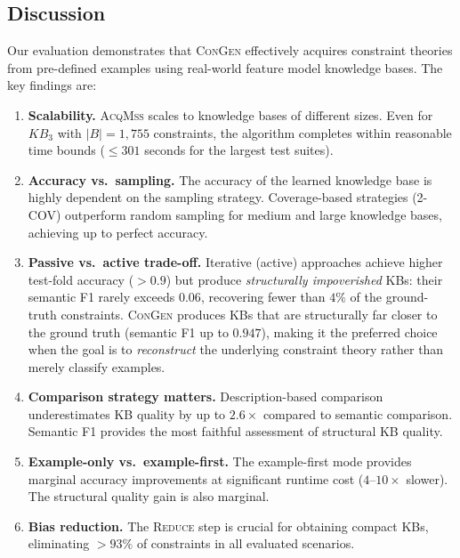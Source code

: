 
\subsection{Discussion}

Our evaluation demonstrates that \textsc{ConGen} effectively acquires constraint theories from pre-defined examples using real-world feature model knowledge bases. The key findings are:

\begin{enumerate}
    \item \textbf{Scalability.} \textsc{AcqMss} scales to knowledge bases of different sizes. Even for $KB_3$ with $|B|{=}1{,}755$ constraints, the algorithm completes within reasonable time bounds (${\leq}301$ seconds for the largest test suites).

    \item \textbf{Accuracy vs.\ sampling.} The accuracy of the learned knowledge base is highly dependent on the sampling strategy. Coverage-based strategies (2-COV) outperform random sampling for medium and large knowledge bases, achieving up to perfect accuracy.

    \item \textbf{Passive vs.\ active trade-off.} Iterative (active) approaches achieve higher test-fold accuracy ($>0.9$) but produce \textit{structurally impoverished} KBs: their semantic F1 rarely exceeds $0.06$, recovering fewer than $4\%$ of the ground-truth constraints. \textsc{ConGen} produces KBs that are structurally far closer to the ground truth (semantic F1 up to $0.947$), making it the preferred choice when the goal is to \textit{reconstruct} the underlying constraint theory rather than merely classify examples.

    \item \textbf{Comparison strategy matters.} Description-based comparison underestimates KB quality by up to $2.6{\times}$ compared to semantic comparison. Semantic F1 provides the most faithful assessment of structural KB quality.

    \item \textbf{Example-only vs.\ example-first.} The example-first mode provides marginal accuracy improvements at significant runtime cost ($4$--$10{\times}$ slower). The structural quality gain is also marginal.

    \item \textbf{Bias reduction.} The \textsc{Reduce} step is crucial for obtaining compact KBs, eliminating $>93\%$ of constraints in all evaluated scenarios.
\end{enumerate}

